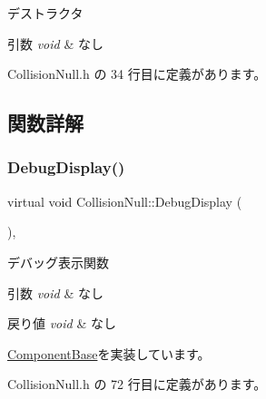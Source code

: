 デストラクタ 


\begin{DoxyParams}{引数}
{\em void} & なし \\
\hline
\end{DoxyParams}


 Collision\+Null.\+h の 34 行目に定義があります。



\subsection{関数詳解}
\mbox{\label{class_collision_null_a3ee0dacfb13c949538519f39d2f6fb0f}} 
\subsubsection{\texorpdfstring{Debug\+Display()}{DebugDisplay()}}
{\footnotesize\ttfamily virtual void Collision\+Null\+::\+Debug\+Display (\begin{DoxyParamCaption}{ }\end{DoxyParamCaption})\hspace{0.3cm}{\ttfamily [inline]}, {\ttfamily [virtual]}}



デバッグ表示関数 


\begin{DoxyParams}{引数}
{\em void} & なし \\
\hline
\end{DoxyParams}

\begin{DoxyRetVals}{戻り値}
{\em void} & なし \\
\hline
\end{DoxyRetVals}


\mbox{\hyperlink{class_component_base_a36ae7d27ad9d756fa245bad443020407}{Component\+Base}}を実装しています。



 Collision\+Null.\+h の 72 行目に定義があります。

\mbox{\label{class_collision_null_a580f507d8918865679feec3cc7b613d1}} 
